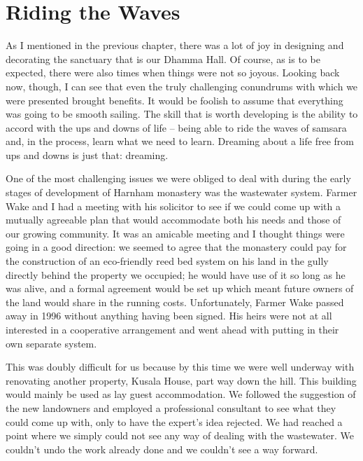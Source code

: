 \chapter[Riding the Waves]{\hspace*{13pt}Riding the Waves}

As I mentioned in the previous chapter, there was a lot of joy in
designing and decorating the sanctuary that is our Dhamma Hall. Of
course, as is to be expected, there were also times when things were not
so joyous. Looking back now, though, I can see that even the truly
challenging conundrums with which we were presented brought benefits. It
would be foolish to assume that everything was going to be smooth
sailing. The skill that is worth developing is the ability to accord
with the ups and downs of life -- being able to ride the waves of
samsara and, in the process, learn what we need to learn. Dreaming about
a life free from ups and downs is just that: dreaming.

One of the most challenging issues we were obliged to deal with during
the early stages of development of Harnham monastery was the wastewater
system. Farmer Wake and I had a meeting with his solicitor to see if we
could come up with a mutually agreeable plan that would accommodate both
his needs and those of our growing community. It was an amicable meeting
and I thought things were going in a good direction: we seemed to agree
that the monastery could pay for the construction of an eco-friendly
reed bed system on his land in the gully directly behind the property we
occupied; he would have use of it so long as he was alive, and a formal
agreement would be set up which meant future owners of the land would
share in the running costs. Unfortunately, Farmer Wake passed away in
1996 without anything having been signed. His heirs were not at all
interested in a cooperative arrangement and went ahead with putting in
their own separate system.

This was doubly difficult for us because by this time we were well
underway with renovating another property, Kusala House, part way down
the hill. This building would mainly be used as lay guest accommodation.
We followed the suggestion of the new landowners and employed a
professional consultant to see what they could come up with, only to
have the expert's idea rejected. We had reached a point where we simply
could not see any way of dealing with the wastewater. We couldn't undo
the work already done and we couldn't see a way forward.

\enlargethispage*{\baselineskip}

